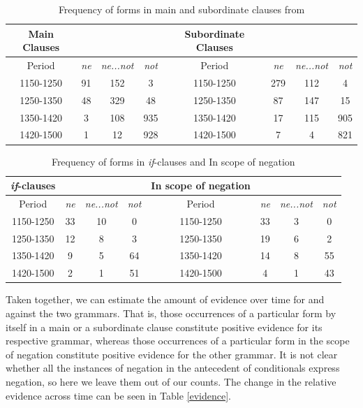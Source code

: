 \documentclass[12pt]{article}
\theoremstyle{definition} \newtheorem{definition}{Definition}
\begin{document}
\begin{table}[ht]
\begin{center}
\begin{tabular}{@{}cccccccc@{}}
\hline
Main Clauses & & & &Subordinate Clauses &  &   &\\
\hline
Period & \emph{ne} & \emph{ne...not} & \emph{not} & Period & \emph{ne} & \emph{ne...not} & \emph{not}\\
\hline
1150-1250 & 91 & 152 & 3  & 1150-1250 & 279 & 112 & 4  \\
1250-1350 & 48 & 329 & 48  & 1250-1350 & 87 & 147 & 15  \\
1350-1420 & 3 & 108 & 935  & 1350-1420 & 17 & 115 & 905  \\
1420-1500 & 1 & 12 & 928  & 1420-1500 & 7 & 4 & 821  \\
\hline
\end{tabular}
  \caption{Frequency of forms in main and subordinate clauses from}
\end{center}
\end{table}

\begin{table}[ht]
\begin{center}
\begin{tabular}{@{}cccccccc@{}}
\hline
\emph{if}-clauses & & & &In scope of negation &   &   &\\
\hline
Period & \emph{ne} & \emph{ne...not} & \emph{not} & Period & \emph{ne} & \emph{ne...not} & \emph{not}\\
\hline
1150-1250 & 33 & 10 & 0  & 1150-1250 & 33 & 3 & 0  \\
1250-1350 & 12 & 8 & 3  & 1250-1350 & 19 & 6 & 2  \\
1350-1420 & 9 & 5 & 64  & 1350-1420 & 14 & 8 & 55  \\
1420-1500 & 2 & 1 & 51  & 1420-1500 & 4 & 1 & 43  \\
\hline
\end{tabular}
  \caption{Frequency of forms in \emph{if}-clauses and In scope of negation}
\end{center}
\end{table}

Taken together, we can estimate the amount of evidence over time for and against the two grammars. That is, those occurrences of a particular form by itself in a main or a subordinate clause constitute positive evidence for its respective grammar, whereas those occurrences of a particular form in the scope of negation constitute positive evidence for the other grammar. It is not clear whether all the instances of negation in the antecedent of conditionals express negation, so here we leave them out of our counts. The change in the relative evidence across time can be seen in Table \ref{evidence}. 
\end{document}
